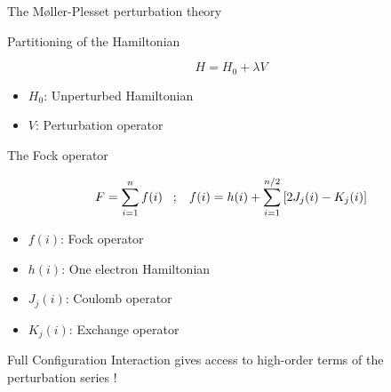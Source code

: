 \documentclass[xcolor=x11names,compress]{beamer}
\renewcommand{\(}{\begin{columns}}
\renewcommand{\)}{\end{columns}}
\newcommand{\<}[1]{\begin{column}{#1}}
\renewcommand{\>}{\end{column}}
\begin{document}
\begin{frame}{The Møller-Plesset perturbation theory}

\pause[1]

\begin{beamerboxesrounded}[scheme=foncé]{\centering Partitioning of the Hamiltonian}

\begin{equation}
   H = H_0 + \lambda V
\end{equation}

\end{beamerboxesrounded}

\begin{itemize}
\centering
    \item $H_0$: Unperturbed Hamiltonian
    \item $V$: Perturbation operator
\end{itemize}

\pause[2]

\begin{beamerboxesrounded}[scheme=foncé]{\centering The Fock operator}

\begin{equation}
   F = \sum\limits_{i=1}^{n} f(i) \hspace{0.3cm} ; \hspace{0.3cm} f(i) = h(i) + \sum\limits_{i=1}^{n/2} \left[2J_j(i) - K_j(i)\right]
\end{equation}

\end{beamerboxesrounded}

\begin{itemize}
\centering
    \item $f(i)$: Fock operator
    \item $h(i)$: One electron Hamiltonian
    \item $J_j(i)$: Coulomb operator
    \item $K_j(i)$: Exchange operator
\end{itemize}

\pause[3]

\begin{beamerboxesrounded}[scheme=foncé]{}
\centering
Full Configuration Interaction gives access to high-order terms of the perturbation series !
\end{beamerboxesrounded}
    
\end{frame}
\end{document}
